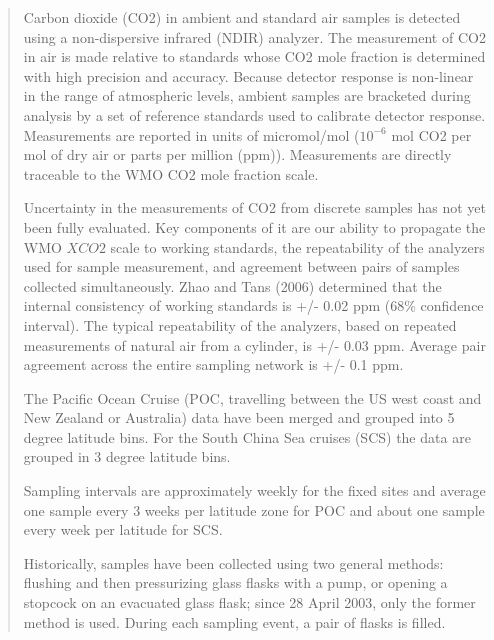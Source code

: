 \documentclass[11pt]{article}\usepackage[]{graphicx}\usepackage[]{color}
\begin{document}
\begin{quote}
Carbon dioxide (CO2) in ambient and standard air samples is
detected using a non-dispersive infrared (NDIR) analyzer.
The measurement of CO2 in air is made relative to standards 
whose CO2 mole fraction is determined with high precision and 
accuracy. Because detector response is non-linear in the range
of atmospheric levels, ambient samples are bracketed during 
analysis by a set of reference standards used to calibrate 
detector response. Measurements are reported in units of 
micromol/mol ($10^{-6}$ mol CO2 per mol of dry air or parts per 
million (ppm)). Measurements are directly traceable to the 
WMO CO2 mole fraction scale.

Uncertainty in the measurements of CO2 from discrete samples 
has not yet been fully evaluated.  Key components of it are our
ability to propagate the WMO $XCO2$ scale to working standards, 
the repeatability of the analyzers used for sample measurement, 
and agreement between pairs of samples collected simultaneously.
Zhao and Tans (2006) determined that the internal consistency
of working standards is +/- 0.02 ppm (68\% confidence interval).
The typical repeatability of the analyzers, based on repeated 
measurements of natural air from a cylinder, is +/- 0.03 ppm.
Average pair agreement across the entire sampling network is
+/- 0.1 ppm.

The Pacific Ocean Cruise (POC, travelling between the US west coast
and New Zealand or Australia) data have been merged and grouped into 
5 degree latitude bins.  For the South China Sea cruises (SCS) the 
data are grouped in 3 degree latitude bins.

Sampling intervals are approximately weekly for the fixed sites
and average one sample every 3 weeks per latitude zone for POC and
about one sample every week per latitude for SCS.

Historically, samples have been collected using two general methods:
flushing and then pressurizing glass flasks with a pump, or opening a
stopcock on an evacuated glass flask; since 28 April 2003, only the
former method is used.  During each sampling event, a pair of flasks 
is filled.
\end{quote}
\end{document}

